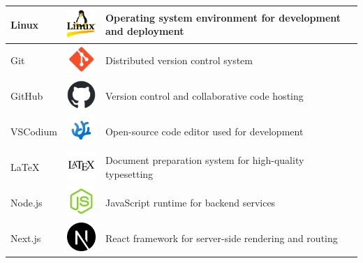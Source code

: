 \begin{longtable}{|m{3.5cm}|m{4cm}|m{6.5cm}|}
    \hline
    \endlastfoot
    Linux & \includegraphics[width=1.5cm]{pictures/web/logo/linux.png} & Operating system environment for development and deployment \\
    \hline
    Git & \includegraphics[width=1.5cm]{pictures/web/logo/git.png} & Distributed version control system \\
    \hline
    GitHub & \includegraphics[width=1.5cm]{pictures/web/logo/github-mark.png} & Version control and collaborative code hosting \\
    \hline
    VSCodium & \includegraphics[width=1.5cm]{pictures/web/logo/vscodium-icon.png} & Open-source code editor used for development \\
    \hline
    LaTeX & \includegraphics[width=1.5cm]{pictures/web/logo/latex.png} & Document preparation system for high-quality typesetting \\
    \hline
    Node.js & \includegraphics[width=1.5cm]{pictures/web/logo/node-svgrepo-com.png} & JavaScript runtime for backend services \\
    \hline
    Next.js & \includegraphics[width=1.5cm]{pictures/web/logo/next-js.png} & React framework for server-side rendering and routing \\

\end{longtable}
